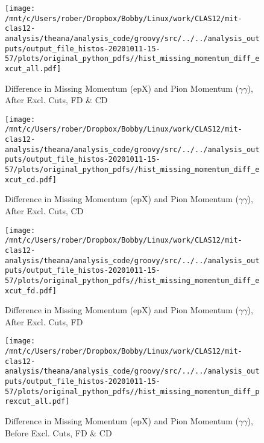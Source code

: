 \documentclass{article}
\begin{document}
\begin{landscape}
\begin{figure}[h]
        \texttt{[image: /mnt/c/Users/rober/Dropbox/Bobby/Linux/work/CLAS12/mit-clas12-analysis/theana/analysis\_code/groovy/src/../../analysis\_outputs/output\_file\_histos-20201011-15-57/plots/original\_python\_pdfs//hist\_missing\_momentum\_diff\_excut\_all.pdf]}
        \captionsetup{textformat=empty,labelformat=blank}
        \caption{Difference in Missing Momentum (epX) and Pion Momentum ($\gamma$$\gamma$), After Excl. Cuts, FD \& CD}
    \end{figure}
    \clearpage
    
    \begin{figure}[h]
        \centering

        \texttt{[image: /mnt/c/Users/rober/Dropbox/Bobby/Linux/work/CLAS12/mit-clas12-analysis/theana/analysis\_code/groovy/src/../../analysis\_outputs/output\_file\_histos-20201011-15-57/plots/original\_python\_pdfs//hist\_missing\_momentum\_diff\_excut\_cd.pdf]}
        \captionsetup{textformat=empty,labelformat=blank}
        \caption{Difference in Missing Momentum (epX) and Pion Momentum ($\gamma$$\gamma$), After Excl. Cuts, CD}
    \end{figure}
    \clearpage
    
    \begin{figure}[h]
        \centering

        \texttt{[image: /mnt/c/Users/rober/Dropbox/Bobby/Linux/work/CLAS12/mit-clas12-analysis/theana/analysis\_code/groovy/src/../../analysis\_outputs/output\_file\_histos-20201011-15-57/plots/original\_python\_pdfs//hist\_missing\_momentum\_diff\_excut\_fd.pdf]}
        \captionsetup{textformat=empty,labelformat=blank}
        \caption{Difference in Missing Momentum (epX) and Pion Momentum ($\gamma$$\gamma$), After Excl. Cuts, FD}
    \end{figure}
    \clearpage
    
    \begin{figure}[h]
        \centering

        \texttt{[image: /mnt/c/Users/rober/Dropbox/Bobby/Linux/work/CLAS12/mit-clas12-analysis/theana/analysis\_code/groovy/src/../../analysis\_outputs/output\_file\_histos-20201011-15-57/plots/original\_python\_pdfs//hist\_missing\_momentum\_diff\_prexcut\_all.pdf]}
        \captionsetup{textformat=empty,labelformat=blank}
        \caption{Difference in Missing Momentum (epX) and Pion Momentum ($\gamma$$\gamma$), Before Excl. Cuts, FD \& CD}
    \end{figure}
    \clearpage
    
    \begin{figure}[h]
        \centering


\end{figure}
\end{landscape}
\end{document}
